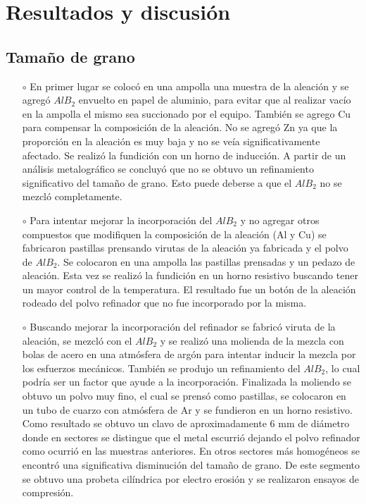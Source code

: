 \documentclass[a4paper,12pt,fleqn,twoside,openany]{book}
\begin{document}
\chapter{Resultados y discusión}



\section{Tamaño de grano}

\begin{itemize}
\item[$\circ$] En primer lugar se colocó en una ampolla una muestra de la aleación y se agregó $AlB_2$ envuelto en papel de aluminio, para evitar que al 
realizar vacío en la ampolla el mismo sea succionado por el equipo. También se agrego Cu para compensar la composición de la aleación. No se agregó Zn 
ya que la proporción en la aleación es muy baja y no se veía significativamente afectado. Se realizó la fundición con un horno de inducción. A partir 
de un análisis metalográfico se concluyó que no se obtuvo un refinamiento significativo del tamaño de grano. Esto puede deberse a que el $AlB_2$ no se 
mezcló completamente.
\item[$\circ$] Para intentar mejorar la incorporación del $AlB_2$ y no agregar otros compuestos que modifiquen la composición de la aleación (Al y Cu) 
se fabricaron pastillas prensando virutas de la aleación ya fabricada y el polvo de $AlB_2$. Se colocaron en una ampolla las pastillas prensadas y un 
pedazo de aleación. Esta vez se realizó la fundición en un horno resistivo buscando tener un mayor control de la temperatura. El resultado fue un botón 
de la aleación rodeado del polvo refinador que no fue incorporado por la misma. 
\item[$\circ$] Buscando mejorar la incorporación del refinador se fabricó viruta de la aleación, se mezcló con el $AlB_2$ y se realizó una molienda de 
la mezcla con bolas de acero en una atmósfera de argón para intentar inducir la mezcla por los esfuerzos mecánicos. También se produjo un refinamiento 
del $AlB_2$, lo cual podría ser un factor que ayude a la incorporación. Finalizada la moliendo se obtuvo un polvo muy fino, el cual se prensó como 
pastillas, se colocaron en un tubo de cuarzo con atmósfera de Ar y se fundieron en un horno resistivo. Como resultado se obtuvo un clavo de aproximadamente 
6 mm de diámetro donde en sectores se distingue que el metal escurrió dejando el polvo refinador como ocurrió en las muestras anteriores. En otros 
sectores más homogéneos se encontró una significativa disminución del tamaño de grano. De este segmento se obtuvo una probeta 
cilíndrica por electro erosión y se realizaron ensayos de compresión. %
\end{itemize}
\end{document}
